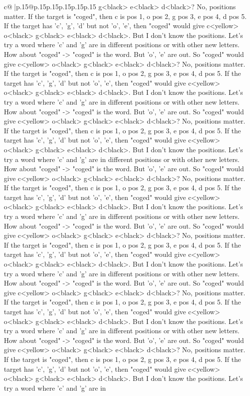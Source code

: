 \documentclass{article}
\begin{document}
{\begin{supertabular}{c@{$\;$}|p{.15\linewidth}@{}p{.15\linewidth}p{.15\linewidth}p{.15\linewidth}p{.15\linewidth}p{.15\linewidth}}
{{{g<black> e<black> d<black>? No, positions matter. If the target is "coged", then c is pos 1, o pos 2, g pos 3, e pos 4, d pos 5. If the target has 'c', 'g', 'd' but not 'o', 'e', then "coged" would give c<yellow> o<black> g<black> e<black> d<black>. But I don't know the positions. Let's try a word where 'c' and 'g' are in different positions or with other new letters. How about "coged" {-}> "coged" is the word. But 'o', 'e' are out. So "coged" would give c<yellow> o<black> g<black> e<black> d<black>? No, positions matter. If the target is "coged", then c is pos 1, o pos 2, g pos 3, e pos 4, d pos 5. If the target has 'c', 'g', 'd' but not 'o', 'e', then "coged" would give c<yellow> o<black> g<black> e<black> d<black>. But I don't know the positions. Let's try a word where 'c' and 'g' are in different positions or with other new letters. How about "coged" {-}> "coged" is the word. But 'o', 'e' are out. So "coged" would give c<yellow> o<black> g<black> e<black> d<black>? No, positions matter. If the target is "coged", then c is pos 1, o pos 2, g pos 3, e pos 4, d pos 5. If the target has 'c', 'g', 'd' but not 'o', 'e', then "coged" would give c<yellow> o<black> g<black> e<black> d<black>. But I don't know the positions. Let's try a word where 'c' and 'g' are in different positions or with other new letters. How about "coged" {-}> "coged" is the word. But 'o', 'e' are out. So "coged" would give c<yellow> o<black> g<black> e<black> d<black>? No, positions matter. If the target is "coged", then c is pos 1, o pos 2, g pos 3, e pos 4, d pos 5. If the target has 'c', 'g', 'd' but not 'o', 'e', then "coged" would give c<yellow> o<black> g<black> e<black> d<black>. But I don't know the positions. Let's try a word where 'c' and 'g' are in different positions or with other new letters. How about "coged" {-}> "coged" is the word. But 'o', 'e' are out. So "coged" would give c<yellow> o<black> g<black> e<black> d<black>? No, positions matter. If the target is "coged", then c is pos 1, o pos 2, g pos 3, e pos 4, d pos 5. If the target has 'c', 'g', 'd' but not 'o', 'e', then "coged" would give c<yellow> o<black> g<black> e<black> d<black>. But I don't know the positions. Let's try a word where 'c' and 'g' are in different positions or with other new letters. How about "coged" {-}> "coged" is the word. But 'o', 'e' are out. So "coged" would give c<yellow> o<black> g<black> e<black> d<black>? No, positions matter. If the target is "coged", then c is pos 1, o pos 2, g pos 3, e pos 4, d pos 5. If the target has 'c', 'g', 'd' but not 'o', 'e', then "coged" would give c<yellow> o<black> g<black> e<black> d<black>. But I don't know the positions. Let's try a word where 'c' and 'g' are in different positions or with other new letters. How about "coged" {-}> "coged" is the word. But 'o', 'e' are out. So "coged" would give c<yellow> o<black> g<black> e<black> d<black>? No, positions matter. If the target is "coged", then c is pos 1, o pos 2, g pos 3, e pos 4, d pos 5. If the target has 'c', 'g', 'd' but not 'o', 'e', then "coged" would give c<yellow> o<black> g<black> e<black> d<black>. But I don't know the positions. Let's try a word where 'c' and 'g' are in }}}
\end{supertabular}}
\end{document}
